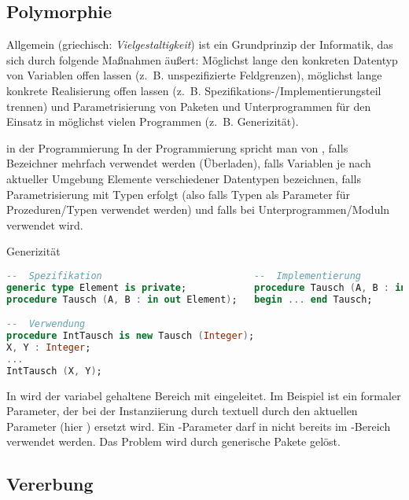 \subsection{%
    Polymorphie%
}

\begin{Def}{Allgemein}
     (griechisch: \emph{Vielgestaltigkeit}) ist ein
    Grundprinzip der Informatik, das sich durch folgende Maßnahmen äußert:
    Möglichst lange den konkreten Datentyp von Variablen offen lassen
    (z.~B. unspezifizierte Feldgrenzen), möglichst lange konkrete
    Realisierung offen lassen (z.~B. Spezifikations-/Implementierungsteil
    trennen) und Parametrisierung von Paketen und Unterprogrammen für den
    Einsatz in möglichst vielen Programmen (z.~B. Generizität).
\end{Def}

\begin{Def}{in der Programmierung}
    In der Programmierung spricht man von , falls
    Bezeichner mehrfach verwendet werden (Überladen), falls
    Variablen je nach aktueller Umgebung Elemente verschiedener Datentypen
    bezeichnen, falls Parametrisierung mit Typen erfolgt (also falls Typen als
    Parameter für Prozeduren/Typen verwendet werden) und falls
     bei Unterprogrammen/Moduln verwendet wird.
\end{Def}

\begin{Def}{Generizität}
\begin{lstlisting}[language=ada]
--  Spezifikation                           --  Implementierung
generic type Element is private;            procedure Tausch (A, B : in out Element) is ...
procedure Tausch (A, B : in out Element);   begin ... end Tausch;

--  Verwendung
procedure IntTausch is new Tausch (Integer);
X, Y : Integer;
...
IntTausch (X, Y);
\end{lstlisting}
    In \Ada{} wird der variabel gehaltene Bereich mit 
    eingeleitet.
    Im Beispiel ist  ein formaler Parameter, der bei der
    Instanziierung durch  textuell durch den aktuellen
    Parameter (hier ) ersetzt wird.
    Ein -Parameter darf in \Ada{} nicht bereits im
    -Bereich verwendet werden.
    Das Problem wird durch generische Pakete gelöst.
\end{Def}

\subsection{%
    Vererbung%
}

